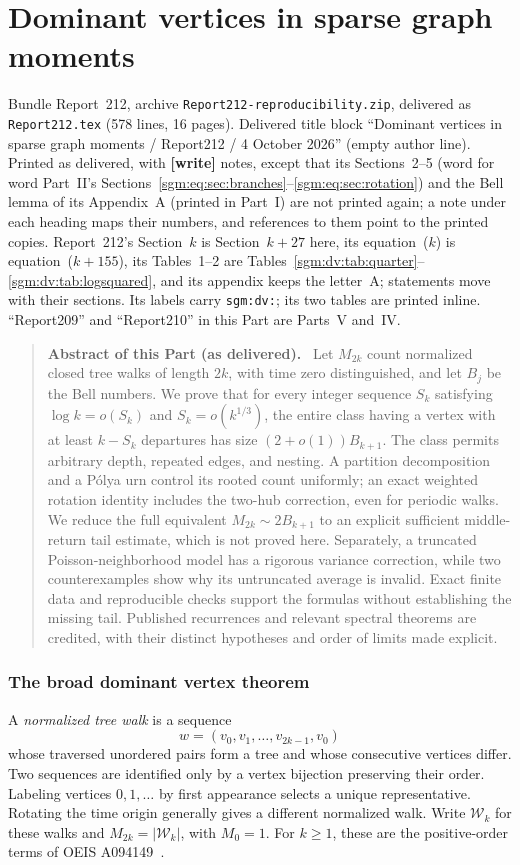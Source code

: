 \documentclass[11pt,letterpaper]{article}
\theoremstyle{remark}\newtheorem{remark}[theorem]{Remark}
\newcommand{\Wc}{\mathcal W}\newcommand{\Uc}{\mathcal U}\newcommand{\Part}{\operatorname{Part}}
\newcommand{\file}[1]{\nolinkurl{#1}}
\newenvironment{partabstract}{\begin{quote}\small\noindent\textbf{Abstract of this Part (as delivered).}\ }{\end{quote}}
\newcommand{\partsource}[1]{\par\noindent\begin{minipage}{\textwidth}\small #1\end{minipage}\par\medskip}
\theoremstyle{definition}\newtheorem{definition}[theorem]{Definition}
\begin{document}
\part{Dominant vertices in sparse graph moments}\label{sgm:dv:part}
\setcounter{section}{27}
\partsource{Bundle Report~212, archive \file{Report212-reproducibility.zip}, delivered as \file{Report212.tex} (578 lines, 16 pages). Delivered title block ``Dominant vertices in sparse graph moments / Report212 / 4 October 2026'' (empty author line). Printed as delivered, with \textbf{[write]} notes, except that its Sections~2--5 (word for word Part~II's Sections~\ref{sgm:eq:sec:branches}--\ref{sgm:eq:sec:rotation}) and the Bell lemma of its Appendix~A (printed in Part~I) are not printed again; a note under each heading maps their numbers, and references to them point to the printed copies. Report~212's Section~$k$ is Section~$k+27$ here, its equation~($k$) is equation~($k+155$), its Tables~1--2 are Tables~\ref{sgm:dv:tab:quarter}--\ref{sgm:dv:tab:logsquared}, and its appendix keeps the letter~A; statements move with their sections. Its labels carry \file{sgm:dv:}; its two tables are printed inline. ``Report209'' and ``Report210'' in this Part are Parts~V and~IV.}
\begin{partabstract}
Let $M_{2k}$ count normalized closed tree walks of length $2k$, with time zero distinguished, and let $B_j$ be the Bell numbers. We prove that for every integer sequence $S_k$ satisfying $\log k=o(S_k)$ and $S_k=o(k^{1/3})$, the entire class having a vertex with at least $k-S_k$ departures has size $(2+o(1))B_{k+1}$. The class permits arbitrary depth, repeated edges, and nesting. A partition decomposition and a P\'olya urn control its rooted count uniformly; an exact weighted rotation identity includes the two-hub correction, even for periodic walks. We reduce the full equivalent $M_{2k}\sim2B_{k+1}$ to an explicit sufficient middle-return tail estimate, which is not proved here. Separately, a truncated Poisson-neighborhood model has a rigorous variance correction, while two counterexamples show why its untruncated average is invalid. Exact finite data and reproducible checks support the formulas without establishing the missing tail. Published recurrences and relevant spectral theorems are credited, with their distinct hypotheses and order of limits made explicit.
\end{partabstract}

\section{The broad dominant vertex theorem}\label{sgm:dv:sec:main}
A \emph{normalized tree walk} is a sequence
\[
 w=(v_0,v_1,\ldots,v_{2k-1},v_0)
\]
whose traversed unordered pairs form a tree and whose consecutive vertices differ. Two sequences are identified only by a vertex bijection preserving their order. Labeling vertices $0,1,\ldots$ by first appearance selects a unique representative. Rotating the time origin generally gives a different normalized walk. Write $\Wc_k$ for these walks and $M_{2k}=|\Wc_k|$, with $M_0=1$. For $k\ge1$, these are the positive-order terms of OEIS A094149~\cite{oeis}.
\end{document}

